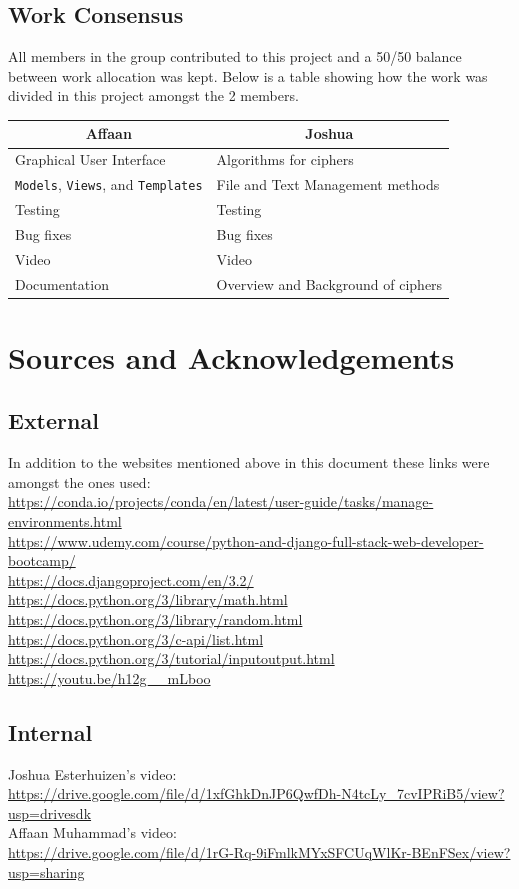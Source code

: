 \documentclass[a4paper, 12pt, titlepage]{report}
\begin{document}
\section{Work Consensus}
All members in the group contributed to this project and a 50/50 balance between work allocation was kept. Below is a table showing how the work was divided in this project amongst the 2 members.
\begin{table}[H]
\centering
\begin{tabular}{@{}ll@{}}
\toprule
\multicolumn{1}{c}{Affaan}   & \multicolumn{1}{c}{Joshua}         \\ \midrule
Graphical User Interface     & Algorithms for ciphers             \\
\texttt{Models}, \texttt{Views}, and \texttt{Templates} & File and Text Management methods            \\
Testing                      & Testing                            \\
Bug fixes                    & Bug fixes                          \\
Video                        & Video                              \\
Documentation                & Overview and Background of ciphers \\ \bottomrule
\end{tabular}
\end{table}
\chapter{Sources and Acknowledgements}
\section{External}
In addition to the websites mentioned above in this document these links were amongst the ones used:\\
\url{https://conda.io/projects/conda/en/latest/user-guide/tasks/manage-environments.html}\\
\url{https://www.udemy.com/course/python-and-django-full-stack-web-developer-bootcamp/}\\
\url{https://docs.djangoproject.com/en/3.2/}\\
\url{https://docs.python.org/3/library/math.html}\\
\url{https://docs.python.org/3/library/random.html}\\
\url{https://docs.python.org/3/c-api/list.html}\\
\url{https://docs.python.org/3/tutorial/inputoutput.html}\\
\url{https://youtu.be/h12g__mLboo}\\
\section{Internal}
Joshua Esterhuizen's video:\\
\url{https://drive.google.com/file/d/1xfGhkDnJP6QwfDh-N4tcLy_7cvIPRiB5/view?usp=drivesdk}\\
Affaan Muhammad's video:\\
\url{https://drive.google.com/file/d/1rG-Rq-9iFmlkMYxSFCUqWlKr-BEnFSex/view?usp=sharing}
\end{document}
